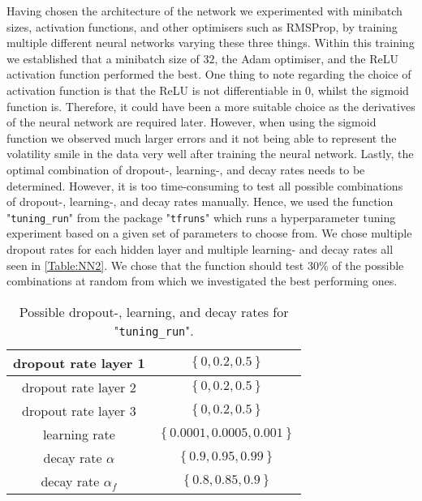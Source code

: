 Having chosen the architecture of the network we experimented with minibatch sizes, activation functions, and other optimisers such as RMSProp, by training multiple different neural networks varying these three things. Within this training we established that a minibatch size of $32$, the Adam optimiser, and the ReLU activation function performed the best. One thing to note regarding the choice of activation function is that the ReLU is not differentiable in $0$, whilst the sigmoid function is. Therefore, it could have been a more suitable choice as the derivatives of the neural network are required later. However, when using the sigmoid function we observed much larger errors and it not being able to represent the volatility smile in the data very well after training the neural network. Lastly, the optimal combination of dropout-, learning-, and decay rates needs to be determined. However, it is too time-consuming to test all possible combinations of dropout-, learning-, and decay rates manually. Hence, we used the function "\lstinline{tuning_run}" from the package "\lstinline{tfruns}" which runs a hyperparameter tuning experiment based on a given set of parameters to choose from. We chose multiple dropout rates for each hidden layer and multiple learning- and decay rates all seen in \autoref{Table:NN2}. We chose that the function should test 30\% of the possible combinations at random from which we investigated the best performing ones.

\begin{table}[H]
    \centering
    {\renewcommand{\arraystretch}{1.25}\begin{tabular}{c|c}
        dropout rate layer 1  & $\left\{0, 0.2, 0.5 \right\}$\\ \hline
        dropout rate layer 2  &  $\left\{0, 0.2, 0.5\right\}$\\ \hline
        dropout rate layer 3  &  $\left\{0, 0.2, 0.5\right\}$\\ \hline
        learning rate         &  $\left\{0.0001, 0.0005, 0.001\right\}$\\ \hline
        decay rate $\alpha$   &  $\left\{0.9, 0.95, 0.99\right\}$\\ \hline
        decay rate $\alpha_f$ &  $\left\{0.8, 0.85, 0.9\right\}$\\ 
    \end{tabular}}
    \caption{Possible dropout-, learning, and decay rates for "\lstinline{tuning_run}".}
    \label{Table:NN2}
\end{table}

